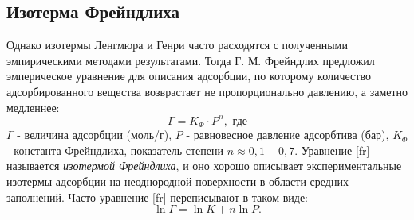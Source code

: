 \documentclass[a4paper,12pt]{article} %
\begin{document}
\subsection*{Изотерма Фрейндлиха}
Однако изотермы Ленгмюра и Генри часто расходятся с полученными эмпирическими методами результатами. Тогда Г. М. Фрейндлих предложил эмперическое уравнение для описания адсорбции, по которому количество адсорбированного вещества возврастает не пропорционально давлению, а заметно медленнее:
\begin{equation}
    \Gamma = K_\Phi \cdot P^n, \textrm{ где}
    \label{fr}
\end{equation}
$\Gamma$ - величина адсорбции (моль/г), 
\newline $P$ - равновесное давление адсорбтива (бар), 
\newline $K_\Phi$ - константа Фрейндлиха, 
\newline показатель степени $n \approx 0,1 - 0,7$.
\newline
Уравнение \eqref{fr} называется \textit{изотермой Фрейндлиха}, и оно хорошо описывает экспериментальные изотермы адсорбции на неоднородной поверхности в области средних заполнений. Часто уравнение \eqref{fr} переписывают в таком виде:
\begin{equation}
    \ln{\Gamma} = \ln K + n \ln P.
\end{equation}
\end{document}
